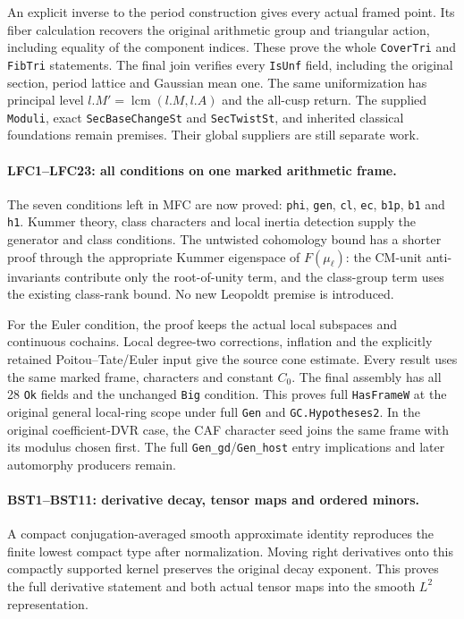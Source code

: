 An explicit inverse to the period construction gives every actual
framed point. Its fiber calculation recovers the original arithmetic
group and triangular action, including equality of the component
indices. These prove the whole \texttt{CoverTri} and \texttt{FibTri}
statements. The final join verifies every \texttt{IsUnf} field,
including the original section, period lattice and Gaussian mean one.
The same uniformization has principal level
$l.M'=\operatorname{lcm}(l.M,l.A)$ and the all-cusp return.
The supplied \texttt{Moduli}, exact \texttt{SecBaseChangeSt} and
\texttt{SecTwistSt}, and inherited classical foundations remain
premises. Their global suppliers are still separate work.

\paragraph{LFC1--LFC23: all conditions on one marked arithmetic frame.}
The seven conditions left in MFC are now proved:
\texttt{phi}, \texttt{gen}, \texttt{cl}, \texttt{ec},
\texttt{b1p}, \texttt{b1} and \texttt{h1}.
Kummer theory, class characters and local inertia detection supply
the generator and class conditions. The untwisted cohomology bound
has a shorter proof through the appropriate Kummer eigenspace of
$F(\mu_\ell)$: the CM-unit anti-invariants contribute only the
root-of-unity term, and the class-group term uses the existing
class-rank bound. No new Leopoldt premise is introduced.

For the Euler condition, the proof keeps the actual local subspaces
and continuous cochains. Local degree-two corrections, inflation
and the explicitly retained Poitou--Tate/Euler input give the
source cone estimate. Every result uses the same marked frame,
characters and constant $C_0$. The final assembly has all 28
\texttt{Ok} fields and the unchanged \texttt{Big} condition.
This proves full \texttt{HasFrameW} at the original general
local-ring scope under full \texttt{Gen} and
\texttt{GC.Hypotheses2}. In the original coefficient-DVR case,
the CAF character seed joins the same frame with its modulus
chosen first. The full \texttt{Gen\_gd}/\texttt{Gen\_host}
entry implications and later automorphy producers remain.

\paragraph{BST1--BST11: derivative decay, tensor maps and ordered minors.}
A compact conjugation-averaged smooth approximate identity reproduces
the finite lowest compact type after normalization. Moving right
derivatives onto this compactly supported kernel preserves the
original decay exponent. This proves the full derivative statement
and both actual tensor maps into the smooth $L^2$ representation.

